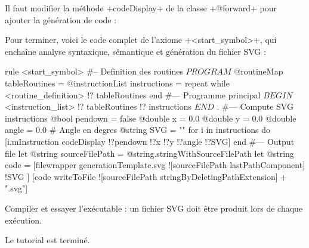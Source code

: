 Il faut modifier la méthode \ggs+codeDisplay+ de la classe \ggs+@forward+ pour ajouter la génération de code :


Pour terminer, voici le code complet de l’axiome \ggs+<start_symbol>+, qui enchaîne analyse syntaxique, sémantique et génération du fichier SVG :
\begin{galgas}
rule <start_symbol> {
#-- Definition des routines
  $PROGRAM$
  @routineMap tableRoutines = {}
  @instructionList instructions = {}
  repeat
  while
    <routine_definition> !? tableRoutines
  end
#--- Programme principal
  $BEGIN$
  <instruction_list> !? tableRoutines !? instructions
  $END$
  $.$
#--- Compute SVG instructions
  @bool pendown = false
  @double x = 0.0
  @double y = 0.0
  @double angle = 0.0 # Angle en degres
  @string SVG = ""
  for i in instructions do
    [i.mInstruction codeDisplay !?pendown !?x !?y !?angle !?SVG]
  end
#--- Output file
  let @string sourceFilePath = @string.stringWithSourceFilePath
  let @string code = [filewrapper generationTemplate.svg
    ![sourceFilePath lastPathComponent]
    !SVG
  ]
  [code writeToFile ![sourceFilePath stringByDeletingPathExtension] + ".svg"]
}
\end{galgas}

Compiler et essayer l'exécutable : un fichier SVG doit être produit lors de chaque exécution.

Le tutorial est terminé.
